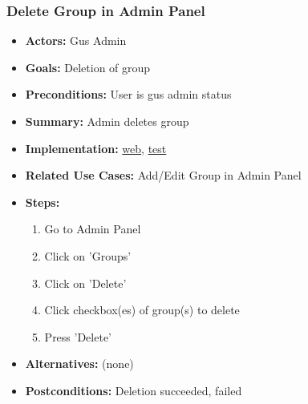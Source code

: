 		\subsubsection{Delete Group in Admin Panel}
			\begin{itemize}
				\item{\textbf{Actors:} Gus Admin}
				\item{\textbf{Goals:} Deletion of group}
				\item{\textbf{Preconditions:} User is gus admin status}
				\item{\textbf{Summary:} Admin deletes group} 
				\item{\textbf{Implementation:} 	\href{http://nwerp.org/gus/index.php/groups/delete}{web},
								\href{http://nwerp.org/gus/index.php/groups/test}{test}
				}
				\item{\textbf{Related Use Cases:} Add/Edit Group in Admin Panel}
				\item{\textbf{Steps:}}
				\begin{enumerate}
					\item Go to Admin Panel
					\item Click on 'Groups'
					\item Click on 'Delete'
					\item Click checkbox(es) of group(s) to delete
					\item Press 'Delete'
				\end{enumerate}
				\item{\textbf{Alternatives:} (none)}
				\item{\textbf{Postconditions:} Deletion succeeded, failed}
			\end{itemize}

